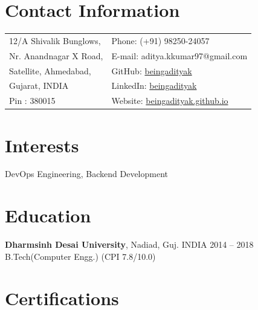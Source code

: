 \documentclass[margin,line]{res}
\begin{document}
 \hfill
{}

\begin{resume}
\section{\sc Contact Information}

\vspace{.05in}
\begin{tabular}{@{}p{3.5in}p{3in}}
12/A Shivalik Bunglows, & {Phone:}  (+91) 98250-24057 \\
Nr. Anandnagar X Road,  & {E-mail:}  aditya.kkumar97@gmail.com\\
Satellite, Ahmedabad,  & {GitHub:} \href{https://github.com/beingadityak}{beingadityak}\\
Gujarat, INDIA  & {LinkedIn:} \href{https://www.linkedin.com/in/beingadityak}{beingadityak}\\
Pin : 380015 & {Website:} \url{beingadityak.github.io}
\end{tabular}


\section{\sc Interests}

DevOps Engineering, Backend Development

\section{\sc Education}
{\bf Dharmsinh Desai University}, Nadiad, Guj. INDIA \hfill 2014 -- 2018\\
B.Tech(Computer Engg.) \hfill(CPI 7.8/10.0)

\section{\sc Certifications}


\end{resume}
\end{document}
